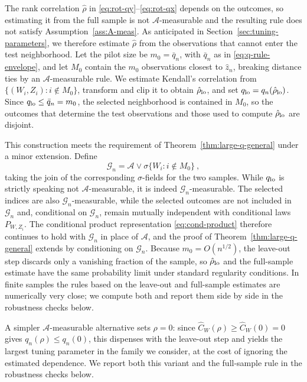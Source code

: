 \documentclass[11pt]{article}
\numberwithin{equation}{section}
\begin{document}
The rank correlation $\hat\rho$ in \eqref{eq:rot-qy}--\eqref{eq:rot-qx} depends on the outcomes, so estimating it from the full sample is not $\mathcal A$-measurable and the resulting rule does not satisfy Assumption~\ref{ass:A-meas}. As anticipated in Section~\ref{sec:tuning-parameters}, we therefore estimate $\hat\rho$ from the observations that cannot enter the test neighborhood. Let the pilot size be $m_0=\bar q_n$, with $\bar q_n$ as in \eqref{eq:q-rule-envelope}, and let $M_0$ contain the $m_0$ observations closest to $\hat z_n$, breaking distance ties by an $\mathcal A$-measurable rule. We estimate Kendall's correlation from $\{(W_i,Z_i):i\notin M_0\}$, transform and clip it to obtain $\hat\rho_{\rm lo}$, and set $q_{\rm lo}=q_n(\hat\rho_{\rm lo})$. Since $q_{\rm lo}\le\bar q_n=m_0$, the selected neighborhood is contained in $M_0$, so the outcomes that determine the test observations and those used to compute $\hat\rho_{\rm lo}$ are disjoint.

This construction meets the requirement of Theorem~\ref{thm:large-q-general} under a minor extension. Define 
\[
 \mathcal G_n=\mathcal A\vee\sigma\{W_i:i\notin M_0\}~,
\] 
taking the join of the corresponding $\sigma$-fields for the two samples. While $q_{\rm lo}$ is strictly speaking not $\mathcal A$-measurable, it is indeed $\mathcal G_n$-measurable. The selected indices are also $\mathcal G_n$-measurable, while the selected outcomes are not included in $\mathcal G_n$ and, conditional on $\mathcal G_n$, remain mutually independent with conditional laws $P_{W,Z_i}$. The conditional product representation \eqref{eq:cond-product} therefore continues to hold with $\mathcal G_n$ in place of $\mathcal A$, and the proof of Theorem~\ref{thm:large-q-general} extends by conditioning on $\mathcal G_n$. Because $m_0=O(n^{1/2})$, the leave-out step discards only a vanishing fraction of the sample, so $\hat\rho_{\rm lo}$ and the full-sample estimate have the same probability limit under standard regularity conditions. In finite samples the rules based on the leave-out and full-sample estimates are numerically very close; we compute both and report them side by side in the robustness checks below.

A simpler $\mathcal A$-measurable alternative sets $\rho=0$: since $\hat C_W(\rho)\ge\hat C_W(0)=0$ gives $q_n(\rho)\le q_n(0)$, this dispenses with the leave-out step and yields the largest tuning parameter in the family we consider, at the cost of ignoring the estimated dependence. We report both this variant and the full-sample rule in the robustness checks below.
\end{document}
